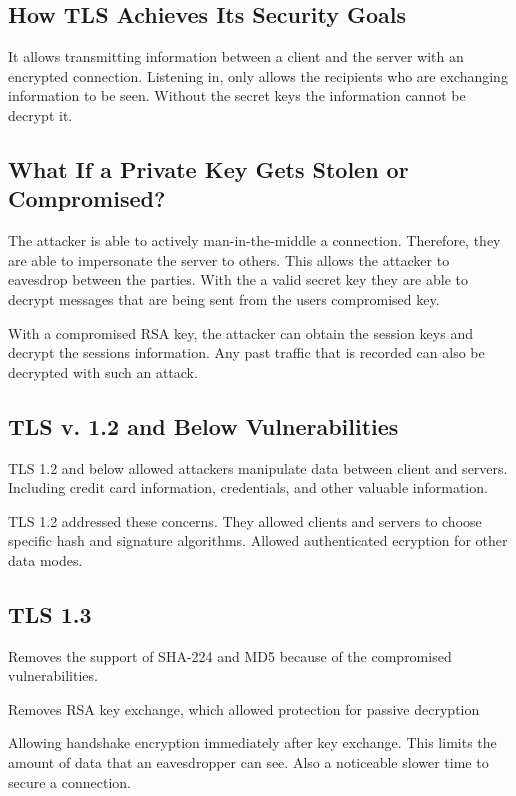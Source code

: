 \documentclass[11pt]{article} %
\begin{document}
\subsection{How TLS Achieves Its Security Goals}
{\parindent0pt It allows transmitting information between a client and the 
server with an encrypted connection. Listening in, only allows the recipients 
who are exchanging information to be seen. Without the secret keys the 
information cannot be decrypt it.}

\subsection{What If a Private Key Gets Stolen or Compromised?}
{\parindent0pt The attacker is able to actively man-in-the-middle a connection.
Therefore, they are able to impersonate the server to others. This allows the 
attacker to eavesdrop between the parties. With the a valid secret key they are
able to decrypt messages that are being sent from the users compromised key.}

\bigskip
{\parindent0pt With a compromised RSA key, the attacker can obtain the session
keys and decrypt the sessions information. Any past traffic that is recorded 
can also be decrypted with such an attack.}

\subsection{TLS v. 1.2 and Below Vulnerabilities}
{\parindent0pt TLS 1.2 and below allowed attackers manipulate data between 
client and servers. Including credit card information, credentials, and other 
valuable information.}

\bigskip
{\parindent0pt TLS 1.2 addressed these concerns. They allowed clients and 
servers to choose specific hash and signature algorithms. Allowed authenticated
ecryption for other data modes.}

\subsection{TLS 1.3}
{\parindent0pt Removes the support of SHA-224 and MD5 because of the compromised
vulnerabilities.}

\bigskip
{\parindent0pt Removes RSA key exchange, which allowed protection for passive 
decryption}

\bigskip
{\parindent0pt Allowing handshake encryption immediately after key exchange. 
This limits the amount of data that an eavesdropper can see. Also a noticeable 
slower time to secure a connection.}
\end{document}
